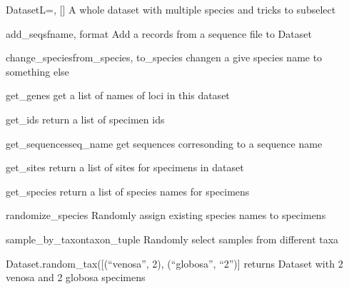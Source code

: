 \documentclass[letterpaper,10pt,english]{manual}
\begin{document}
\hypertarget{SnailBase.Dataset}{}\begin{classdesc}{Dataset}{L=, {[}{]}}
A whole dataset with multiple species and tricks to subselect

\hypertarget{SnailBase.Dataset.add\_seqs}{}\begin{methoddesc}{add\_seqs}{fname, format}
Add a records from a sequence file to Dataset
\end{methoddesc}

\hypertarget{SnailBase.Dataset.change\_species}{}\begin{methoddesc}{change\_species}{from\_species, to\_species}
changen a give species name to something else
\end{methoddesc}

\hypertarget{SnailBase.Dataset.get\_genes}{}\begin{methoddesc}{get\_genes}{}
get a list of names of loci in this dataset
\end{methoddesc}

\hypertarget{SnailBase.Dataset.get\_ids}{}\begin{methoddesc}{get\_ids}{}
return a list of specimen ids
\end{methoddesc}

\hypertarget{SnailBase.Dataset.get\_sequences}{}\begin{methoddesc}{get\_sequences}{seq\_name}
get sequences corresonding to a sequence name
\end{methoddesc}

\hypertarget{SnailBase.Dataset.get\_sites}{}\begin{methoddesc}{get\_sites}{}
return a list of sites for specimens in dataset
\end{methoddesc}

\hypertarget{SnailBase.Dataset.get\_species}{}\begin{methoddesc}{get\_species}{}
return a list of species names for specimens
\end{methoddesc}

\hypertarget{SnailBase.Dataset.randomize\_species}{}\begin{methoddesc}{randomize\_species}{}
Randomly assign existing species names to specimens
\end{methoddesc}

\hypertarget{SnailBase.Dataset.sample\_by\_taxon}{}\begin{methoddesc}{sample\_by\_taxon}{taxon\_tuple}
Randomly select samples from different taxa

Dataset.random\_tax({[}(``venosa'', 2), (``globosa'', ``2''){]} returns Dataset
with 2 venosa and 2 globosa specimens
\end{methoddesc}
\end{classdesc}
\end{document}

